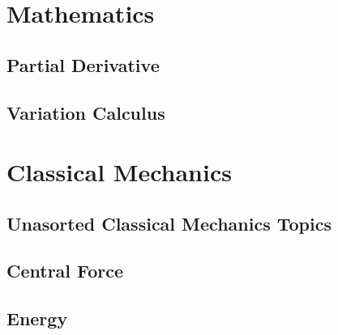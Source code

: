 \documentclass[10pt]{report}
\begin{document}
\pagestyle{empty}

\clearpage

\chapter*{Mathematics}



\section*{Partial Derivative}
\clearpage
\clearpage

\section*{Variation Calculus}
\clearpage
\clearpage

\chapter*{Classical Mechanics}
\section*{Unasorted Classical Mechanics Topics}
\clearpage
\clearpage

\section*{Central Force}
\clearpage

\section*{Energy}
\clearpage
\end{document}
